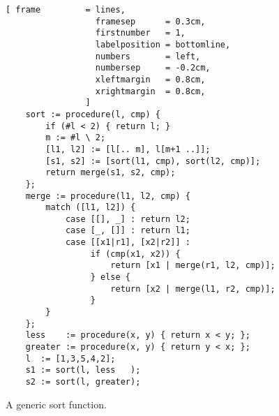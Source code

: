 \begin{figure}[!ht]
\centering
\begin{Verbatim}[ frame         = lines, 
                  framesep      = 0.3cm, 
                  firstnumber   = 1,
                  labelposition = bottomline,
                  numbers       = left,
                  numbersep     = -0.2cm,
                  xleftmargin   = 0.8cm,
                  xrightmargin  = 0.8cm,
                ]
    sort := procedure(l, cmp) {
        if (#l < 2) { return l; }
        m := #l \ 2;
        [l1, l2] := [l[.. m], l[m+1 ..]];
        [s1, s2] := [sort(l1, cmp), sort(l2, cmp)];
        return merge(s1, s2, cmp);
    };
    merge := procedure(l1, l2, cmp) {
        match ([l1, l2]) {
            case [[], _] : return l2;
            case [_, []] : return l1;
            case [[x1|r1], [x2|r2]] : 
                 if (cmp(x1, x2)) {
                     return [x1 | merge(r1, l2, cmp)];
                 } else {
                     return [x2 | merge(l1, r2, cmp)];
                 }
        }
    };
    less    := procedure(x, y) { return x < y; };
    greater := procedure(x, y) { return y < x; };
    l  := [1,3,5,4,2];    
    s1 := sort(l, less   );
    s2 := sort(l, greater);
\end{Verbatim}
\vspace*{-0.3cm}
\caption{A generic sort function.}
\label{fig:merge-sort.stlx}
\end{figure}

